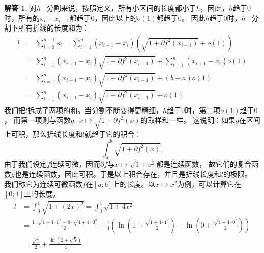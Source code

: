\documentclass[12pt,UTF8]{ctexbook}
\newcommand{\dash}{\,–\,}
\newcommand{\olim}[1]{\mathit{o}\left(#1\right)}  %
\theoremstyle{definition}
\newtheorem*{so}{解答}
\theoremstyle{plain}
\begin{document}
\begin{so}
    对$h$\dash 分割来说，按照定义，所有小区间的长度都小于$h$，因此，$h$趋于$0$时，所有的$x_i - x_{i-1}$都趋于$0$，因此以上的$\olim{1}$都趋于$0$。
    因此$h$趋于$0$时，$h$\dash 分割下所有折线的长度和为：
    \begin{align*}
        l &= \sum_{i=0}^{n-1} s_i = \sum_{i=1}^{n} (x_{i+1} - x_{i})\left(\sqrt{1 + \partial f^2(x_{i-1})} + \olim{1}\right) \\
        &= \sum_{i=1}^{n} (x_{i+1} - x_{i})\sqrt{1 + \partial f^2(x_{i-1})} + \sum_{i=1}^{n} (x_{i+1} - x_{i})\olim{1} \\
        &= \sum_{i=1}^{n} (x_{i+1} - x_{i})\sqrt{1 + \partial f^2(x_{i-1})} + (b - a)\olim{1} \\
        &= \sum_{i=1}^{n} (x_{i+1} - x_{i})\sqrt{1 + \partial f^2(x_{i-1})} + \olim{1}
    \end{align*}
    我们把$l$拆成了两项的和。当分割不断变得更精细，$h$趋于$0$时，第二项$\olim{1}$趋于$0$，
    而第一项则与函数$g: \;x\mapsto \sqrt{1 + \partial f^2(x) }$的取样和一样。
    这说明：如果$g$在区间上可积，那么折线长度和$l$就趋于它的积合：
    $$ \int_a^b \sqrt{1 + \partial f^2(x) }. $$
    由于我们设定$f$连续可微，因而$\partial f$与$x\mapsto \sqrt{1 + x^2}$都是连续函数，
    故它们的复合函数$g$也是连续函数，因此可积。于是以上积合存在，并且是折线长度和$l$的极限。
    我们称它为连续可微函数$f$在$[a;b]$上的长度。以$x\mapsto x^2$为例，可以计算它在$[0;1]$上的长度。 
    \begin{align*}
        l &= \int_0^1 \sqrt{1 + (2x)^2 } = \int_0^1 \sqrt{1 + 4x^2 } \\
        &= \frac{1\cdot \sqrt{1 + 4\cdot 1^2} - 0\cdot \sqrt{1 + 4\cdot 0^2}}{2} + \frac{1}{4}\left( \ln{\left(1 + \frac{\sqrt{1 + 4\cdot 1^2}}{2}\right)} -  \ln{\left(0 + \frac{\sqrt{1 + 4\cdot 0^2}}{2}\right)}\right) \\
        &= \frac{\sqrt{5}}{2} + \frac{\ln{\left(2 + \sqrt{5}\right)}}{4}.
    \end{align*}

\end{so}
\end{document}

